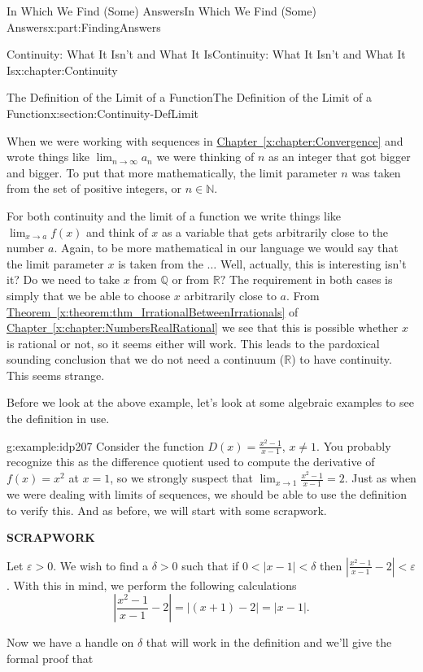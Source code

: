 \documentclass[oneside,10pt,]{book}
\newcommand{\xreffont}{\relax}
\newcommand{\terminology}[1]{\textbf{#1}}
\numberwithin{equation}{section}
\newcommand{\abs}[1]{\left|#1\right|}
\def\limit#1#2#3{{\displaystyle\lim_{#1\rightarrow #2}#3}}
\newcommand{\eps}{\varepsilon}
\newcommand{\RR}{\mathbb {R}}
\newcommand{\QQ}{\mathbb {Q}}
\newcommand{\NN}{\mathbb {N}}
\newcommand{\lt}{<}
\begin{document}
\begin{partptx}{In Which We Find (Some) Answers}{}{In Which We Find (Some) Answers}{}{}{x:part:FindingAnswers}
\begin{chapterptx}{Continuity: What It Isn't and What It Is}{}{Continuity: What It Isn't and What It Is}{}{}{x:chapter:Continuity}
\begin{sectionptx}{The Definition of the Limit of a Function}{}{The Definition of the Limit of a Function}{}{}{x:section:Continuity-DefLimit}
\par
When we were working with sequences in \hyperref[x:chapter:Convergence]{Chapter~{\xreffont\ref{x:chapter:Convergence}}} and wrote things like \(\limit{n}{\infty}{a_n}\) we were thinking of \(n\) as an integer that got bigger and bigger.  To put that more mathematically, the limit parameter \(n\) was taken from the set of positive integers, or \(n\in \NN\).%
\par
For both continuity and the limit of a function we write things like \(\limit{x}{a}{f(x)}\) and think of \(x\) as a variable that gets arbitrarily close to the number \(a\).  Again, to be more mathematical in our language we would say that the limit parameter \(x\) is taken from the \(\ldots\) Well, actually, this is interesting isn't it?  Do we need to take \(x\) from \(\QQ\) or from \(\RR?\) The requirement in both cases is simply that we be able to choose \(x\) arbitrarily close to \(a\). From \hyperref[x:theorem:thm_IrrationalBetweenIrrationals]{Theorem~{\xreffont\ref{x:theorem:thm_IrrationalBetweenIrrationals}}} of \hyperref[x:chapter:NumbersRealRational]{Chapter~{\xreffont\ref{x:chapter:NumbersRealRational}}} we see that this is possible whether \(x\) is rational or not, so it seems either will work.  This leads to the pardoxical sounding conclusion that we do not need a continuum (\(\RR\)) to have continuity.  This seems strange.%
\par
Before we look at the above example, let's look at some algebraic examples to see the definition in use.%
\begin{example}{}{g:example:idp207}%
Consider the function \(D(x)=\frac{x^2-1}{x-1}\), \(x\neq 1\).  You probably recognize this as the difference quotient used to compute the derivative of \(f(x)=x^2\) at \(x=1\), so we strongly suspect that \(\limit{x}{1}{\frac{x^2-1}{x-1}}=2\).  Just as when we were dealing with limits of sequences, we should be able to use the definition to verify this.  And as before, we will start with some scrapwork.%
\par
\terminology{SCRAPWORK}%
\par
Let \(\eps>0\).  We wish to find a \(\delta>0\) such that if \(0\lt \abs{x-1}\lt \delta\) then \(\abs{\frac{x^2-1}{x-1}-2}\lt \eps\).  With this in mind, we perform the following calculations%
\begin{equation*}
\abs{\frac{x^2-1}{x-1}-2}=\abs{(x+1)-2} = \abs{x-1}\text{.}
\end{equation*}
%
\par
Now we have a handle on \(\delta\) that will work in the definition and we'll give the formal proof that%

\end{example}
\end{sectionptx}
\end{chapterptx}
\end{partptx}
\end{document}
